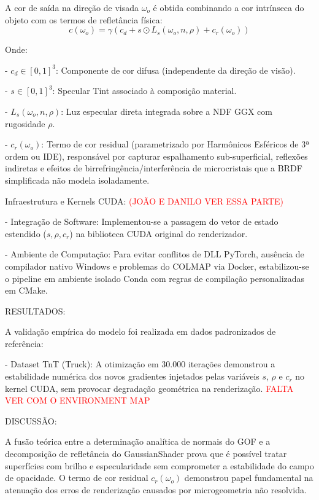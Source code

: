 \documentclass[12pt]{article}
\begin{document}
A cor de saída na direção de visada $\omega_o$ é obtida combinando a cor intrínseca do objeto com os termos de refletância física:  $$c(\omega_o) = \gamma \left( c_d + s \odot L_s(\omega_o, n, \rho) + c_r(\omega_o) \right)$$

Onde:

- $c_d \in [0,1]^3$: Componente de cor difusa (independente da direção de visão).

- $s \in [0,1]^3$: Specular Tint associado à composição material.

- $L_s(\omega_o, n, \rho)$: Luz especular direta integrada sobre a NDF GGX com rugosidade $\rho$.

- $c_r(\omega_o)$: Termo de cor residual (parametrizado por Harmônicos Esféricos de 3ª ordem ou IDE), responsável por capturar espalhamento sub-superficial, reflexões indiretas e efeitos de birrefringência/interferência de microcristais que a BRDF simplificada não modela isoladamente.

Infraestrutura e Kernels CUDA: \textcolor{red}{(JOÃO E DANILO VER ESSA PARTE)}

- Integração de Software: Implementou-se a passagem do vetor de estado estendido ($s, \rho, c_r$) na biblioteca CUDA original do renderizador.

- Ambiente de Computação: Para evitar conflitos de DLL PyTorch, ausência de compilador nativo Windows e problemas do COLMAP via Docker, estabilizou-se o pipeline em ambiente isolado Conda com regras de compilação personalizadas em CMake.

RESULTADOS:

A validação empírica do modelo foi realizada em dados padronizados de referência:

- Dataset TnT (Truck): A otimização em 30.000 iterações demonstrou a estabilidade numérica dos novos gradientes injetados pelas variáveis $s$, $\rho$ e $c_r$ no kernel CUDA, sem provocar degradação geométrica na renderização. \textcolor{red}{FALTA VER COM O ENVIRONMENT MAP}

DISCUSSÃO:

A fusão teórica entre a determinação analítica de normais do GOF e a decomposição de refletância do GaussianShader prova que é possível tratar superfícies com brilho e especularidade sem comprometer a estabilidade do campo de opacidade. O termo de cor residual $c_r(\omega_o)$ demonstrou papel fundamental na atenuação dos erros de renderização causados por microgeometria não resolvida.
\end{document}
